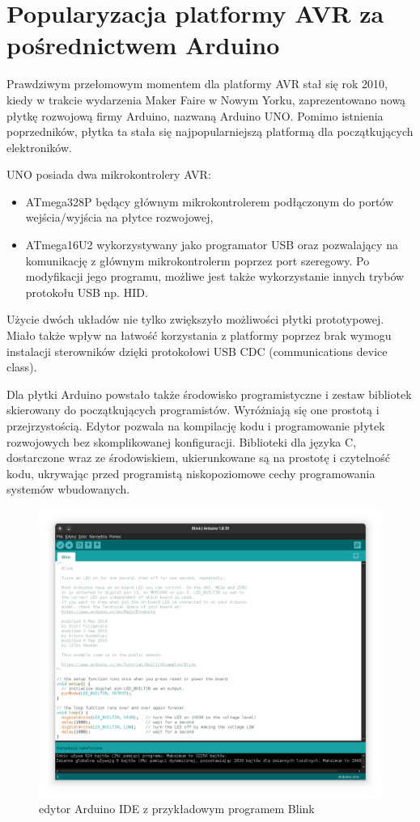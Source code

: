 \section{Popularyzacja platformy AVR za pośrednictwem Arduino}

Prawdziwym przełomowym momentem dla platformy AVR stał się rok 2010, kiedy w trakcie wydarzenia Maker Faire w Nowym Yorku, zaprezentowano nową płytkę rozwojową firmy Arduino, nazwaną Arduino UNO. Pomimo istnienia poprzedników, płytka ta stała się najpopularniejszą platformą dla początkujących elektroników.

UNO posiada dwa mikrokontrolery AVR:
\begin{itemize}
\item ATmega328P będący głównym mikrokontrolerem podłączonym do portów wejścia/wyjścia na płytce rozwojowej,
\item ATmega16U2 wykorzystywany jako programator USB oraz pozwalający na komunikację z głównym mikrokontrolerm poprzez port szeregowy. Po modyfikacji jego programu, możliwe jest także wykorzystanie innych trybów protokołu USB np. HID.
\end{itemize}
Użycie dwóch układów nie tylko zwiększyło możliwości płytki prototypowej. Miało także wpływ na łatwość korzystania z platformy poprzez brak wymogu instalacji sterowników dzięki protokołowi USB CDC (communications device class).

Dla płytki Arduino powstało także środowisko programistyczne i zestaw bibliotek skierowany do początkujących programistów. Wyróżniają się one prostotą i przejrzystością. Edytor pozwala na kompilację kodu i programowanie płytek rozwojowych bez skomplikowanej konfiguracji. Biblioteki dla języka C, dostarczone wraz ze środowiskiem, ukierunkowane są na prostotę i czytelność kodu, ukrywając przed programistą niskopoziomowe cechy programowania systemów wbudowanych.
\begin{figure}[H]
\centering
	\includegraphics[width=1\textwidth]{graf/arduino-ide-blink.png}
		\caption{edytor Arduino IDE z przykładowym programem Blink}
\end{figure}

